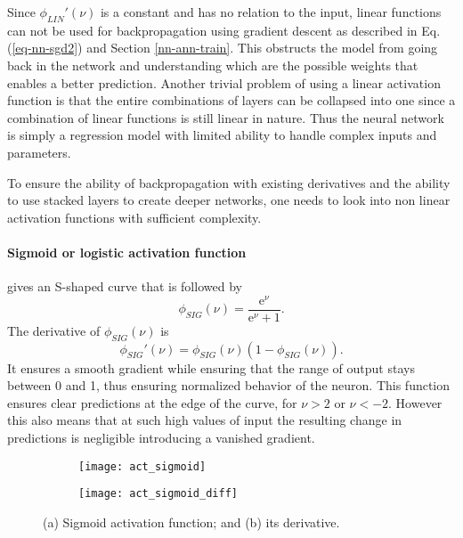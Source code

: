 Since $ \phi_{LIN}'(\nu) $ is a constant and has no relation to the input, linear functions can not be used for backpropagation using gradient descent as described in Eq. (\ref{eq-nn-sgd2}) and Section \ref{nn-ann-train}. This obstructs the model from going back in the network and understanding which are the possible weights that enables a better prediction. Another trivial problem of using a linear activation function is that the entire combinations of layers can be collapsed into one since a combination of linear functions is still linear in nature. Thus the neural network is simply a regression model with limited ability to handle complex inputs and parameters.

To ensure the ability of backpropagation with existing derivatives and the ability to use stacked layers to create deeper networks, one needs to look into non linear activation functions with sufficient complexity.

\paragraph*{Sigmoid or logistic activation function} gives an S-shaped curve that is followed by 
\begin{equation}\label{app-act-4}
\phi_{SIG}(\nu)=\frac{\text{e}^\nu}{\text{e}^\nu+1}.
\end{equation}
The derivative of $ \phi_{SIG}(\nu) $ is
\begin{equation}\label{app-act-4-1}
\phi_{SIG}'(\nu)=\phi_{SIG}(\nu)(1-\phi_{SIG}(\nu)).
\end{equation}
It ensures a smooth gradient while ensuring that the range of output stays between 0 and 1, thus ensuring normalized behavior of the neuron. This function ensures clear predictions at the edge of the curve, for $ \nu>2 $ or $ \nu<-2 $. However this also means that at such high values of input the resulting change in predictions is negligible introducing a vanished gradient.

\begin{figure}
	\centering
	\begin{subfigure}{0.45\textwidth}
		\texttt{[image: act\_sigmoid]}
		\caption{}
	\end{subfigure}
	\begin{subfigure}{0.45\textwidth}
		\texttt{[image: act\_sigmoid\_diff]}
		\caption{}
	\end{subfigure}
	\caption{(a) Sigmoid activation function; and (b) its derivative.}
\end{figure}


